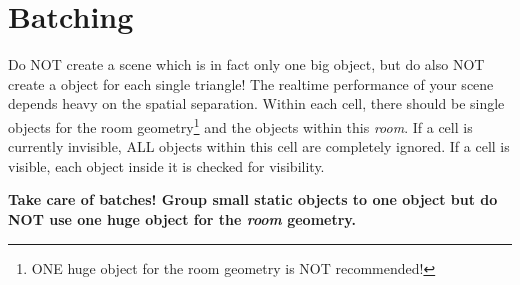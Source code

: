 \chapter{Batching}
Do NOT create a scene which is in fact only one big object, but do also NOT create a object for each single triangle! The realtime performance of your scene depends heavy on the spatial separation. Within each cell, there should be single objects for the room geometry\footnote{ONE huge object for the room geometry is NOT recommended!} and the objects within this \emph{room}. If a cell is currently invisible, ALL objects within this cell are completely ignored. If a cell is visible, each object inside it is checked for visibility.

\textbf{Take care of batches! Group small static objects to one object but do NOT use one huge object for the \emph{room} geometry.}
